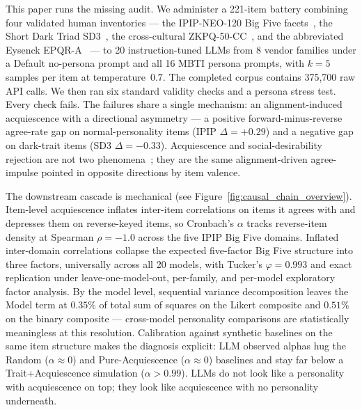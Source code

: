 This paper runs the missing audit. We administer a 221-item battery combining four validated human inventories --- the IPIP-NEO-120 Big Five facets~\citep{johnson2014measuring}, the Short Dark Triad SD3~\citep{jones2014introducing}, the cross-cultural ZKPQ-50-CC~\citep{aluja2006cross}, and the abbreviated Eysenck EPQR-A~\citep{francis1992development} --- to 20 instruction-tuned LLMs from 8 vendor families under a Default no-persona prompt and all 16 MBTI persona prompts, with $k=5$ samples per item at temperature~$0.7$. The completed corpus contains 375{,}700 raw API calls. We then ran six standard validity checks and a persona stress test. Every check fails. The failures share a single mechanism: an alignment-induced acquiescence with a directional asymmetry --- a positive forward-minus-reverse agree-rate gap on normal-personality items (IPIP $\Delta=+0.29$) and a negative gap on dark-trait items (SD3 $\Delta=-0.33$). Acquiescence and social-desirability rejection are not two phenomena~\citep{couch1960yeasayers,crowne1960social,paulhus1991response,billiet2000modeling}; they are the same alignment-driven agree-impulse pointed in opposite directions by item valence.

The downstream cascade is mechanical (see Figure~\ref{fig:causal_chain_overview}). Item-level acquiescence inflates inter-item correlations on items it agrees with and depresses them on reverse-keyed items, so Cronbach's $\alpha$ tracks reverse-item density at Spearman $\rho=-1.0$ across the five IPIP Big Five domains. Inflated inter-domain correlations collapse the expected five-factor Big Five structure into three factors, universally across all 20 models, with Tucker's $\varphi=0.993$ and exact replication under leave-one-model-out, per-family, and per-model exploratory factor analysis. By the model level, sequential variance decomposition leaves the Model term at $0.35\%$ of total sum of squares on the Likert composite and $0.51\%$ on the binary composite --- cross-model personality comparisons are statistically meaningless at this resolution. Calibration against synthetic baselines on the same item structure makes the diagnosis explicit: LLM observed alphas hug the Random ($\alpha\!\approx\!0$) and Pure-Acquiescence ($\alpha\!\approx\!0$) baselines and stay far below a Trait+Acquiescence simulation ($\alpha>0.99$). LLMs do not look like a personality with acquiescence on top; they look like acquiescence with no personality underneath.

